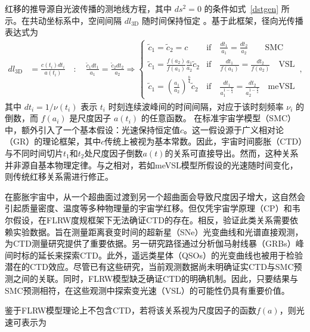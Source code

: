 \documentclass[jkps,preprint,fleqn]{revtex4}
\newcommand{\tc}{\tilde{c}}
\begin{document}
红移的推导源自光波传播的测地线方程，其中 $ds^2 = 0$ 的条件如式~\eqref{dstgen} 所示。在共动坐标系中，空间间隔 $dl_{3\textrm{D}}$ 随时间保持恒定 \cite{Lee:2024mal,Lee:2024zcu}。基于此框架，径向光传播表达式为
\begin{align}
d l_{3\textrm{D}} &= \frac{c(t_i) dt_i}{a(t_i)} \quad : \quad \frac{\tc_1 dt_1}{a_1} = \frac{\tc_2 dt_2}{a_2} \Rightarrow \begin{cases} \tc_1 = \tc_2 = c & \textrm{if} \quad \frac{dt_1}{a_1} = \frac{dt_2}{a_2} \qquad \textrm{SMC} \\
\tc_1 = \frac{f(a_2)}{f(a_1)} \frac{a_1}{a_2} \tc_2 & \textrm{if} \quad \frac{dt_1}{f(a_1)} = \frac{dt_2}{f(a_2)} \quad \textrm{VSL} \\ \tc_1 = \left( \frac{a_1}{a_2}\right)^{\frac{b}{4}} \tc_2 & \textrm{if} \quad \frac{dt_1}{a_1^{1-\frac{b}{4}}} = \frac{dt_2}{a_2^{1-\frac{b}{4}}} \quad \textrm{meVSL}  \end{cases} \,, \label{dl3D}
\end{align}
其中 $dt_i = 1/\nu(t_i)$ 表示 $t_i$ 时刻连续波峰间的时间间隔，对应于该时刻频率 $\nu_i$ 的倒数，而 $f(a_i)$ 是尺度因子 $a(t_i)$ 的任意函数。
在标准宇宙学模型（SMC）中，额外引入了一个基本假设：光速保持恒定值$c$。这一假设源于广义相对论（GR）的理论框架，其中$c$传统上被视为基本常数。因此，宇宙时间膨胀（CTD）与不同时间切片$t_1$和$t_2$处尺度因子倒数$a(t)$的关系可直接导出。然而，这种关系并非源自基本物理定律。与之相对，若如meVSL模型所假设的光速随时间变化，则传统红移关系需进行修正。

在膨胀宇宙中，从一个超曲面过渡到另一个超曲面会导致尺度因子增大，这自然会引起质量密度、温度等多种物理量的宇宙学红移。但仅凭宇宙学原理（CP）和韦尔假设，在FLRW度规框架下无法确证CTD的存在。相反，验证此类关系需要依赖实验数据。旨在测量距离衰变时间的超新星（SNe）光变曲线和光谱直接观测，为CTD测量研究提供了重要依据\cite{Leibundgut:1996qm,SupernovaSearchTeam:1997gem,Foley:2005qu,Blondin:2007ua,Blondin:2008mz,Lee:2023ucu,DES:2024vgg,Lee:2024kxa}。另一研究路径通过分析伽马射线暴（GRBs）峰间时标的延长来探索CTD\cite{Norris:1993hda,Wijers:1994qf,Band:1994ee,Meszaros:1995gj,Lee:1996zu,Chang:2001fy,Crawford:2009be,Zhang:2013yna,Singh:2021jgr}。此外，遥远类星体（QSOs）的光变曲线也被用于检验潜在的CTD效应\cite{Hawkins:2001be,Dai:2012wp,Lewis:2023jab}。尽管已有这些研究，当前观测数据尚未明确证实CTD与SMC预测之间的关联。同时，FLRW模型缺乏确证CTD的明确机制。因此，只要结果与SMC预测相符，在这些观测中探索变光速（VSL）的可能性仍具有重要价值。

鉴于FLRW模型理论上不包含CTD，若将该关系视为尺度因子的函数$f(a)$，则光速可表示为
\end{document}
